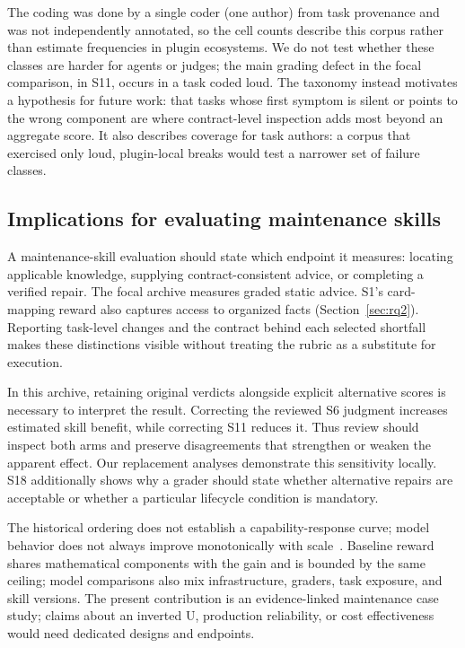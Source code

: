 \documentclass[11pt]{article}
\begin{document}
The coding was done by a single coder (one author) from task provenance and was not independently annotated, so the cell counts describe this corpus rather than estimate frequencies in plugin ecosystems. We do not test whether these classes are harder for agents or judges; the main grading defect in the focal comparison, in S11, occurs in a task coded loud. The taxonomy instead motivates a hypothesis for future work: that tasks whose first symptom is silent or points to the wrong component are where contract-level inspection adds most beyond an aggregate score. It also describes coverage for task authors: a corpus that exercised only loud, plugin-local breaks would test a narrower set of failure classes.




\subsection{Implications for evaluating maintenance skills}
A maintenance-skill evaluation should state which endpoint it measures: locating applicable knowledge, supplying contract-consistent advice, or completing a verified repair. The focal archive measures graded static advice. S1's card-mapping reward also captures access to organized facts (Section~\ref{sec:rq2}). Reporting task-level changes and the contract behind each selected shortfall makes these distinctions visible without treating the rubric as a substitute for execution.

In this archive, retaining original verdicts alongside explicit alternative scores is necessary to interpret the result. Correcting the reviewed S6 judgment increases estimated skill benefit, while correcting S11 reduces it. Thus review should inspect both arms and preserve disagreements that strengthen or weaken the apparent effect. Our replacement analyses demonstrate this sensitivity locally. S18 additionally shows why a grader should state whether alternative repairs are acceptable or whether a particular lifecycle condition is mandatory.

The historical ordering does not establish a capability-response curve; model behavior does not always improve monotonically with scale~\citep{inverse-scaling}. Baseline reward shares mathematical components with the gain and is bounded by the same ceiling; model comparisons also mix infrastructure, graders, task exposure, and skill versions. The present contribution is an evidence-linked maintenance case study; claims about an inverted U, production reliability, or cost effectiveness would need dedicated designs and endpoints.
\end{document}
